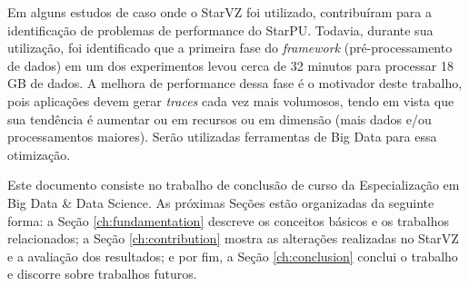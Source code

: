 Em alguns estudos de caso onde o StarVZ foi utilizado, contribuíram para a identificação de problemas de performance do StarPU. Todavia, durante sua utilização, foi identificado que a primeira fase do \emph{framework} (pré-processamento de dados) em um dos experimentos levou cerca de 32 minutos para processar 18 GB de dados. A melhora de performance dessa fase é o motivador deste trabalho, pois aplicações devem gerar \emph{traces} cada vez mais volumosos, tendo em vista que sua tendência é aumentar ou em recursos ou em dimensão (mais dados e/ou processamentos maiores). Serão utilizadas ferramentas de Big Data para essa otimização.

Este documento consiste no trabalho de conclusão de curso da Especialização em Big Data \& Data Science. As próximas Seções estão organizadas da seguinte forma: a Seção \ref{ch:fundamentation} descreve os conceitos básicos e os trabalhos relacionados; a Seção \ref{ch:contribution} mostra as alterações realizadas no StarVZ e a avaliação dos resultados; e por fim, a Seção \ref{ch:conclusion} conclui o trabalho e discorre sobre trabalhos futuros.
